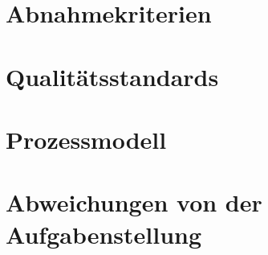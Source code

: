 \section{Abnahmekriterien}


\section{Qualitätsstandards}

\section{Prozessmodell}

\section[Abweichungen]{Abweichungen von der Aufgabenstellung}